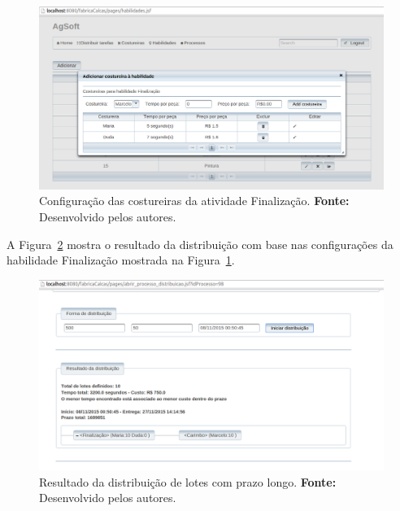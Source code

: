 \newpage

\begin{figure}[h!]
	\centerline{\includegraphics[scale=0.3]{./imagens/cofiguracao_habilidade_teste3.png}}
	\caption[Configuração das costureiras da atividade Finalização.]
	{Configuração das costureiras da atividade Finalização. \textbf{Fonte:}
	Desenvolvido pelos autores.}
	\label{fig:configuracao_habilidade_costureira_teste3}
\end{figure}


\par A Figura~\ref{fig:resultado1_teste3} mostra o resultado da distribuição
com base nas configurações da habilidade Finalização mostrada na Figura~\ref{fig:configuracao_habilidade_costureira_teste3}.

\begin{figure}[h!]
	\centerline{\includegraphics[scale=0.3]{./imagens/resultado1_teste3.png}}
	\caption[Resultado da distribuição de lotes com prazo longo.]
	{Resultado da distribuição de lotes com prazo longo. \textbf{Fonte:} Desenvolvido pelos
	autores.}
	\label{fig:resultado1_teste3}
\end{figure}

